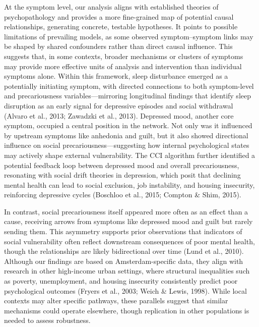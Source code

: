 \documentclass[
]{article}
\begin{document}
At the symptom level, our analysis aligns with established theories of
psychopathology and provides a more fine-grained map of potential causal
relationships, generating concrete, testable hypotheses. It points to
possible limitations of prevailing models, as some observed
symptom--symptom links may be shaped by shared confounders rather than
direct causal influence. This suggests that, in some contexts, broader
mechanisms or clusters of symptoms may provide more effective units of
analysis and intervention than individual symptoms alone. Within this
framework, sleep disturbance emerged as a potentially initiating
symptom, with directed connections to both symptom-level and
precariousness variables---mirroring longitudinal findings that identify
sleep disruption as an early signal for depressive episodes and social
withdrawal (Alvaro et al., 2013; Zawadzki et al., 2013). Depressed mood,
another core symptom, occupied a central position in the network. Not
only was it influenced by upstream symptoms like anhedonia and guilt,
but it also showed directional influence on social
precariousness---suggesting how internal psychological states may
actively shape external vulnerability. The CCI algorithm further
identified a potential feedback loop between depressed mood and overall
precariousness, resonating with social drift theories in depression,
which posit that declining mental health can lead to social exclusion,
job instability, and housing insecurity, reinforcing depressive cycles
(Boschloo et al., 2015; Compton \& Shim, 2015).

In contrast, social precariousness itself appeared more often as an
effect than a cause, receiving arrows from symptoms like depressed mood
and guilt but rarely sending them. This asymmetry supports prior
observations that indicators of social vulnerability often reflect
downstream consequences of poor mental health, though the relationships
are likely bidirectional over time (Lund et al., 2010). Although our
findings are based on Amsterdam-specific data, they align with research
in other high-income urban settings, where structural inequalities such
as poverty, unemployment, and housing insecurity consistently predict
poor psychological outcomes (Fryers et al., 2003; Weich \& Lewis, 1998).
While local contexts may alter specific pathways, these parallels
suggest that similar mechanisms could operate elsewhere, though
replication in other populations is needed to assess robustness.
\end{document}
